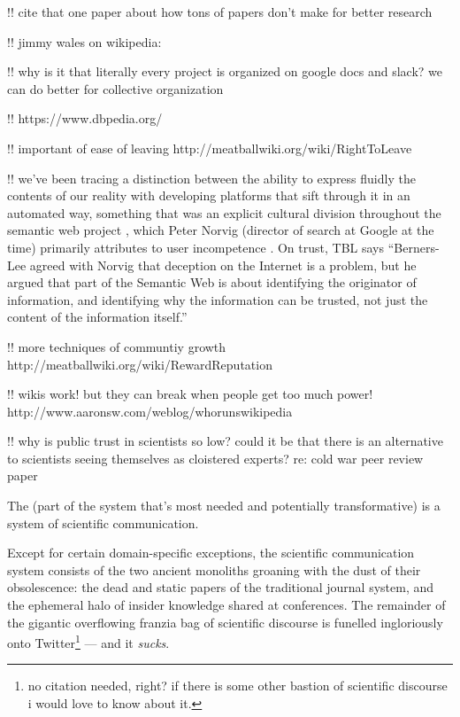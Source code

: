 \documentclass[10pt]{article}
\begin{document}
\begin{multicols}{2}
 !! cite that one paper about how tons of papers don't make
for better research

!! jimmy wales on wikipedia:

!! why is it that literally every project is organized on google docs
and slack? we can do better for collective organization

!! https://www.dbpedia.org/

!! important of ease of leaving
http://meatballwiki.org/wiki/RightToLeave

!! we've been tracing a distinction between the ability to express
fluidly the contents of our reality with developing platforms that sift
through it in an automated way, something that was an explicit cultural
division throughout the semantic web project \cite{swartzTechniquesMassCollaboration2006} , which Peter Norvig (director
of search at Google at the time) primarily attributes to user
incompetence \cite{lombardiGoogleExecChallenges2007} . On trust,
TBL says ``Berners-Lee agreed with Norvig that deception on the Internet
is a problem, but he argued that part of the Semantic Web is about
identifying the originator of information, and identifying why the
information can be trusted, not just the content of the information
itself.''

!! more techniques of communtiy growth
http://meatballwiki.org/wiki/RewardReputation

!! wikis work! but they can break when people get too much power!
http://www.aaronsw.com/weblog/whorunswikipedia

!! why is public trust in scientists so low? could it be that there is
an alternative to scientists seeing themselves as cloistered experts?
re: cold war peer review paper

The (part of the system that's most needed and potentially
transformative) is a system of scientific communication.

Except for certain domain-specific exceptions, the scientific
communication system consists of the two ancient monoliths groaning with
the dust of their obsolescence: the dead and static papers of the
traditional journal system, and the ephemeral halo of insider knowledge
shared at conferences. The remainder of the gigantic overflowing franzia
bag of scientific discourse is funelled ingloriously onto
Twitter\footnote{no citation needed, right? if there is some other
  bastion of scientific discourse i would love to know about it.} ---
and it \emph{sucks}.


\end{multicols}
\end{document}
